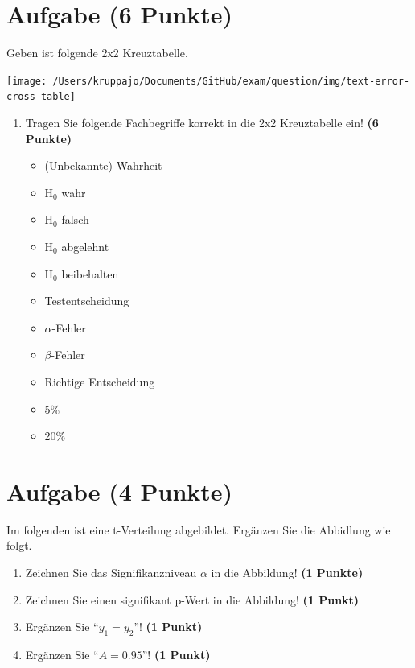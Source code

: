 \documentclass[a4paper, 10pt]{scrartcl}\usepackage[]{graphicx}\usepackage[]{xcolor}
\begin{document}
\section{Aufgabe \hfill (6 Punkte)}



Geben ist folgende 2x2 Kreuztabelle. 

\begin{center}
  \texttt{[image: /Users/kruppajo/Documents/GitHub/exam/question/img/text-error-cross-table]}
\end{center}

\begin{enumerate}
\item Tragen Sie folgende Fachbegriffe korrekt in die 2x2 Kreuztabelle ein! \textbf{(6 Punkte)}
  \begin{itemize}
  \item (Unbekannte) Wahrheit	
  \item H$_0$ wahr
  \item H$_0$ falsch
  \item H$_0$ abgelehnt
  \item H$_0$ beibehalten
  \item Testentscheidung
  \item $\alpha$-Fehler
  \item $\beta$-Fehler
  \item Richtige Entscheidung
  \item 5\%
  \item 20\%
  \end{itemize}
\end{enumerate}



 
\clearpage

\section{Aufgabe \hfill (4 Punkte)}



Im folgenden ist eine t-Verteilung abgebildet. Erg{\"a}nzen Sie die Abbidlung wie folgt.

\begin{enumerate}
\item Zeichnen Sie das Signifikanzniveau $\alpha$ in die Abbildung! \textbf{(1 Punkte)} 
\item Zeichnen Sie einen signifikant p-Wert in die Abbildung! \textbf{(1 Punkt)} 
\item Erg{\"a}nzen Sie "`$\bar{y}_1 = \bar{y}_2$"'! \textbf{(1 Punkt)} 
\item Erg{\"a}nzen Sie "`$A = 0.95$"'! \textbf{(1 Punkt)} 
\end{enumerate}
\end{document}
